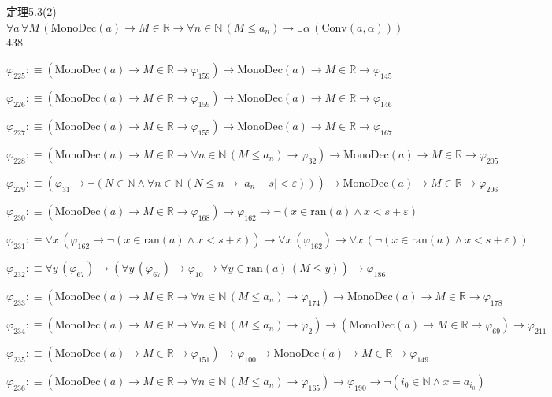 \begin{fullproof}{定理5.3(2)}{$\forall a\,\forall M\,(\mathrm{MonoDec}(a) \to M \in \mathbb{R} \to \forall n \in \mathbb{N}\,(M \leq a_{n}) \to \exists \alpha\,(\mathrm{Conv}(a,\alpha)))$}{438}
\begin{abbrevlist}
\item $\varphi_{225} :\equiv (\mathrm{MonoDec}(a) \to M \in \mathbb{R} \to \varphi_{159}) \to \mathrm{MonoDec}(a) \to M \in \mathbb{R} \to \varphi_{145}$
\item $\varphi_{226} :\equiv (\mathrm{MonoDec}(a) \to M \in \mathbb{R} \to \varphi_{159}) \to \mathrm{MonoDec}(a) \to M \in \mathbb{R} \to \varphi_{146}$
\item $\varphi_{227} :\equiv (\mathrm{MonoDec}(a) \to M \in \mathbb{R} \to \varphi_{155}) \to \mathrm{MonoDec}(a) \to M \in \mathbb{R} \to \varphi_{167}$
\item $\varphi_{228} :\equiv (\mathrm{MonoDec}(a) \to M \in \mathbb{R} \to \forall n \in \mathbb{N}\,(M \leq a_{n}) \to \varphi_{32}) \to \mathrm{MonoDec}(a) \to M \in \mathbb{R} \to \varphi_{205}$
\item $\varphi_{229} :\equiv (\varphi_{31} \to \neg (N \in \mathbb{N} \land \forall n \in \mathbb{N}\,(N \leq n \to \lvert a_{n} - s \rvert < \varepsilon))) \to \mathrm{MonoDec}(a) \to M \in \mathbb{R} \to \varphi_{206}$
\item $\varphi_{230} :\equiv (\mathrm{MonoDec}(a) \to M \in \mathbb{R} \to \varphi_{168}) \to \varphi_{162} \to \neg (x \in \mathrm{ran}(a) \land x < s + \varepsilon)$
\item $\varphi_{231} :\equiv \forall x\,(\varphi_{162} \to \neg (x \in \mathrm{ran}(a) \land x < s + \varepsilon)) \to \forall x\,(\varphi_{162}) \to \forall x\,(\neg (x \in \mathrm{ran}(a) \land x < s + \varepsilon))$
\item $\varphi_{232} :\equiv \forall y\,(\varphi_{67}) \to (\forall y\,(\varphi_{67}) \to \varphi_{10} \to \forall y \in \mathrm{ran}(a)\,(M \leq y)) \to \varphi_{186}$
\item $\varphi_{233} :\equiv (\mathrm{MonoDec}(a) \to M \in \mathbb{R} \to \forall n \in \mathbb{N}\,(M \leq a_{n}) \to \varphi_{174}) \to \mathrm{MonoDec}(a) \to M \in \mathbb{R} \to \varphi_{178}$
\item $\varphi_{234} :\equiv (\mathrm{MonoDec}(a) \to M \in \mathbb{R} \to \forall n \in \mathbb{N}\,(M \leq a_{n}) \to \varphi_{2}) \to (\mathrm{MonoDec}(a) \to M \in \mathbb{R} \to \varphi_{69}) \to \varphi_{211}$
\item $\varphi_{235} :\equiv (\mathrm{MonoDec}(a) \to M \in \mathbb{R} \to \varphi_{151}) \to \varphi_{100} \to \mathrm{MonoDec}(a) \to M \in \mathbb{R} \to \varphi_{149}$
\item $\varphi_{236} :\equiv (\mathrm{MonoDec}(a) \to M \in \mathbb{R} \to \forall n \in \mathbb{N}\,(M \leq a_{n}) \to \varphi_{165}) \to \varphi_{190} \to \neg (i_{0} \in \mathbb{N} \land x = a_{i_{0}})$

\end{abbrevlist}
\end{fullproof}
